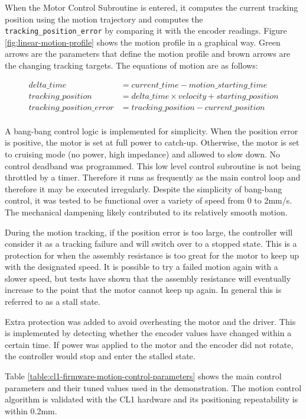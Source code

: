 When the Motor Control Subroutine is entered, it computes the current tracking position using the motion trajectory and computes the {\tt tracking\_position\_error} by comparing it with the encoder readings. 
Figure \ref{fig:linear-motion-profile} shows the motion profile in a graphical way. Green arrows are the parameters that define the motion profile and brown arrows are the changing tracking targets.
The equations of motion are as follows:

\begin{align*}
    delta\_time &= current\_time - motion\_starting\_time \nonumber \\
tracking\_position &= delta\_time \times velocity +  starting\_position \nonumber \\
tracking\_position\_error &= tracking\_position - current\_position \nonumber \\
\end{align*}

A bang-bang control logic is implemented for simplicity. When the position error is positive, the motor is set at full power to catch-up. Otherwise, the motor is set to cruising mode (no power, high impedance) and allowed to slow down. No control deadband was programmed. This low level control subroutine is not being throttled by a timer. Therefore it runs as frequently as the main control loop and therefore it may be executed irregularly. Despite the simplicity of bang-bang control, it was tested to be functional over a variety of speed from 0 to 2mm/s. The mechanical dampening likely contributed to its relatively smooth motion.

During the motion tracking, if the position error is too large, the controller will consider it as a tracking failure and will switch over to a stopped state. This is a protection for when the assembly resistance is too great for the motor to keep up with the designated speed. It is possible to try a failed motion again with a slower speed, but tests have shown that the assembly resistance will eventually increase to the point that the motor cannot keep up again. In general this is referred to as a stall state. 

Extra protection was added to avoid overheating the motor and the driver. This is implemented by detecting whether the encoder values have changed within a certain time. If power was applied to the motor and the encoder did not rotate, the controller would stop and enter the stalled state. 

Table \ref{table:cl1-firmware-motion-control-parameters} shows the main control parameters and their tuned values used in the demonstration. The motion control algorithm is validated with the CL1 hardware and its positioning repeatability is within 0.2mm.

